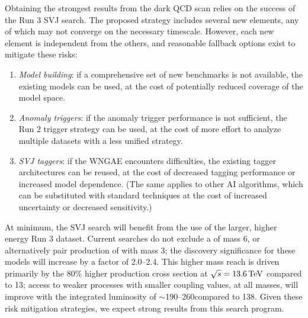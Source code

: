 Obtaining the strongest results from the dark QCD scan relies on the success of the Run 3 SVJ search.
The proposed strategy includes several new elements, any of which may not converge on the necessary timescale.
However, each new element is independent from the others, and reasonable fallback options exist to mitigate these risks:
\begin{enumerate}
\item \textit{Model building}: if a comprehensive set of new benchmarks is not available, the existing models can be used, at the cost of potentially reduced coverage of the model space.
\item \textit{Anomaly triggers}: if the anomaly trigger performance is not sufficient, the Run 2 trigger strategy can be used, at the cost of more effort to analyze multiple datasets with a less unified strategy.
\item \textit{SVJ taggers}: if the WNGAE encounters difficulties, the existing tagger architectures can be reused, at the cost of decreased tagging performance or increased model dependence. (The same applies to other AI algorithms, which can be substituted with standard techniques at the cost of increased uncertainty or decreased sensitivity.)
\end{enumerate}
At minimum, the SVJ search will benefit from the use of the larger, higher energy Run 3 dataset.
Current searches do not exclude a \PZprime of mass 6\TeV, or alternatively pair production of \Pbifun with mass 3\TeV;
the discovery significance for these models will increase by a factor of 2.0--2.4.
This higher mass reach is driven primarily by the 80\% higher production cross section at $\sqrt{s}=13.6\,\text{Te\hspace{-.08em}V}$ compared to 13\TeV;
access to weaker processes with smaller coupling values, at all masses, will improve with the integrated luminosity of ${\sim}$190--260\fbinv compared to 138\fbinv.
Given these risk mitigation strategies, we expect strong results from this search program.
